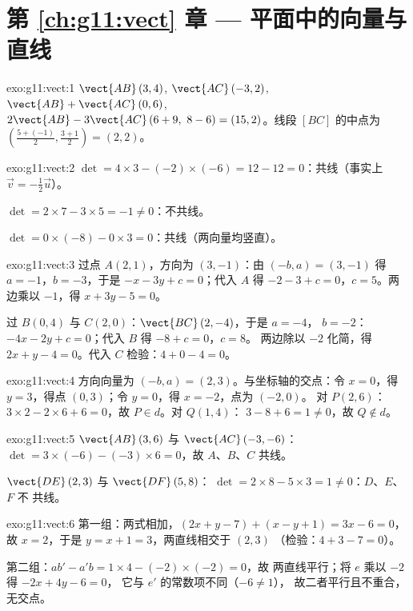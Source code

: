 \section*{第 \ref{ch:g11:vect} 章 --- 平面中的向量与直线}

\begin{solution}{exo:g11:vect:1}
$\vect{AB}\,(3, 4)$, $\vect{AC}\,(-3, 2)$,
$\vect{AB} + \vect{AC}\,(0, 6)$,
$2\vect{AB} - 3\vect{AC}\,(6 + 9,\ 8 - 6) = (15, 2)$。线段
$[BC]$ 的中点为 $\left(\frac{5 + (-1)}{2}, \frac{3+1}{2}\right) = (2, 2)$。
\end{solution}

\begin{solution}{exo:g11:vect:2}
$\det = 4 \times 3 - (-2) \times (-6) = 12 - 12 = 0$：共线（事实上
$\vec v = -\frac12 \vec u$）。

$\det = 2 \times 7 - 3 \times 5 = -1 \neq 0$：不共线。

$\det = 0 \times (-8) - 0 \times 3 = 0$：共线（两向量均竖直）。
\end{solution}

\begin{solution}{exo:g11:vect:3}
过点 $A(2,1)$，方向为 $(3, -1)$：由 $(-b, a) = (3, -1)$ 得
$a = -1$，$b = -3$，于是 $-x - 3y + c = 0$；代入 $A$ 得 $-2 - 3 + c =
0$，$c = 5$。两边乘以 $-1$，得 $x + 3y - 5 = 0$。

过 $B(0,4)$ 与 $C(2,0)$：$\vect{BC}\,(2, -4)$，于是 $a = -4$，
$b = -2$：$-4x - 2y + c = 0$；代入 $B$ 得 $-8 + c = 0$，$c = 8$。
两边除以 $-2$ 化简，得 $2x + y - 4 = 0$。代入 $C$ 检验：$4 + 0 - 4 = 0$。
\end{solution}

\begin{solution}{exo:g11:vect:4}
方向向量为 $(-b, a) = (2, 3)$。与坐标轴的交点：令 $x = 0$，得
$y = 3$，得点 $(0, 3)$；令 $y = 0$，得 $x = -2$，点为 $(-2, 0)$。
对 $P(2,6)$：$3 \times 2 - 2 \times 6 + 6 = 0$，故 $P \in d$。对 $Q(1,4)$：
$3 - 8 + 6 = 1 \neq 0$，故 $Q \notin d$。
\end{solution}

\begin{solution}{exo:g11:vect:5}
$\vect{AB}\,(3, 6)$ 与 $\vect{AC}\,(-3, -6)$：
$\det = 3 \times (-6) - (-3) \times 6 = 0$，故 $A$、$B$、$C$ 共线。

$\vect{DE}\,(2, 3)$ 与 $\vect{DF}\,(5, 8)$：
$\det = 2 \times 8 - 5 \times 3 = 1 \neq 0$：$D$、$E$、$F$ 不
共线。
\end{solution}

\begin{solution}{exo:g11:vect:6}
第一组：两式相加，$(2x + y - 7) + (x - y + 1) =
3x - 6 = 0$，故 $x = 2$，于是 $y = x + 1 = 3$，两直线相交于 $(2, 3)$
（检验：$4 + 3 - 7 = 0$）。

第二组：$ab' - a'b = 1 \times 4 - (-2) \times (-2) = 0$，故
两直线平行；将 $e$ 乘以 $-2$ 得 $-2x + 4y - 6 = 0$，
它与 $e'$ 的常数项不同（$-6 \neq 1$），
故二者平行且不重合，无交点。
\end{solution}

